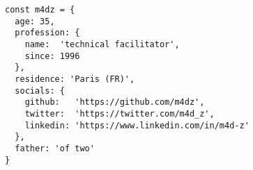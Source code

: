 \vspace{2mm}
\begin{cvparagraph}
  \begin{lstlisting}
const m4dz = {
  age: 35,
  profession: {
    name:  'technical facilitator',
    since: 1996
  },
  residence: 'Paris (FR)',
  socials: {
    github:   'https://github.com/m4dz',
    twitter:  'https://twitter.com/m4d_z',
    linkedin: 'https://www.linkedin.com/in/m4d-z'
  },
  father: 'of two'
}
  \end{lstlisting}
\end{cvparagraph}
\vspace{-2mm}
